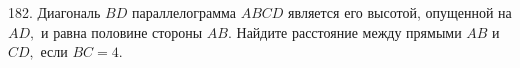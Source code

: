 182. Диагональ $BD$ параллелограмма $ABCD$ является его высотой, опущенной на $AD,$ и равна половине стороны $AB.$ Найдите расстояние между прямыми $AB$ и $CD,$ если $BC = 4.$\\
